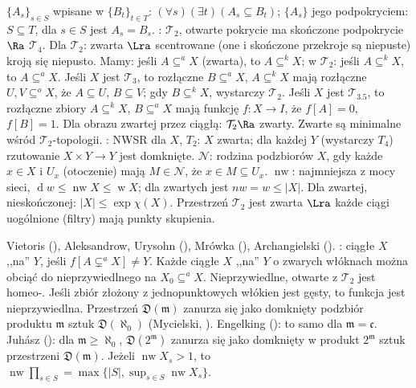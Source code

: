   $\{A_s\}_{s\in S}$ wpisane w $\{B_t\}_{t \in T}$: $(\forall s)(\exists t)(A_s \subseteq B_t)$; $\{A_s\}$ jego podpokryciem: $S \subseteq T$, dla $s \in S$ jest $A_s = B_s$.
: $\mathcal T_2$, otwarte pokrycie ma skończone podpokrycie $\Ra$ $\mathcal T_4$.
Dla $\mathcal T_2$: zwarta $\Lra$ scentrowane  (one i skończone przekroje są niepuste) kroją się niepusto.
Mamy: jeśli $A \subseteq^a X$ (zwarta), to $A \subseteq^k X$; w $\mathcal T_2$: jeśli $A \subseteq^k X$, to $A \subseteq^a X$.
Jeśli $X$ jest $\mathcal T_3$, to rozłączne $B \subseteq^a X$, $A \subseteq^k X$ mają rozłączne $U, V \subseteq^o X$, że $A \subseteq U$, $B \subseteq V$; gdy $B \subseteq^k X$, wystarczy $\mathcal T_2$.
Jeśli $X$ jest $\mathcal T_{3.5}$, to rozłączne zbiory $A \subseteq^k X$, $B \subseteq^a X$ mają funkcję $f \colon X \to I$, że $f[A] = 0$, $f[B] = 1$.
Dla obrazu zwartej przez ciągłą: $\mathcal T_2 \Ra$ zwarty.
Zwarte są minimalne wśród $\mathcal T_2$-topologii.
: NWSR dla $X$, $T_2$: $X$ zwarta; dla każdej $Y$ (wystarczy $T_4$) rzutowanie $X \times Y \to Y$ jest domknięte.
 $\mathcal N $: rodzina podzbiorów $X$, gdy każde $x \in X$ i $U_x$ (otoczenie) mają $M \in \mathcal N$, że $x \in M \subseteq U_x$.
 $\operatorname{nw}$: najmniejsza z mocy sieci, $\operatorname{d} w \le \operatorname{nw} X \le \operatorname{w} X$; dla zwartych jest $nw = w \le |X|$.
Dla zwartej, nieskończonej: $|X| \le \exp \chi(X)$.
Przestrzeń $\mathcal T_2$ jest zwarta $\Lra$ każde ciągi uogólnione (filtry) mają punkty skupienia.

Vietoris (), Aleksandrow, Urysohn (), Mrówka (), Archangielski ().
: ciągłe $X$ ,,na'' $Y$, jeśli $f[A \subsetneq^a X] \neq Y$.
Każde ciągłe $X$ ,,na'' $Y$ o zwarych włóknach można obciąć do nieprzywiedlnego na $X_0 \subseteq^a X$.
Nieprzywiedlne, otwarte z $\mathcal T_2$ jest homeo-.
Jeśli zbiór złożony z jednopunktowych włókien jest gęsty, to funkcja jest nieprzywiedlna.
Przestrzeń $\mathfrak D(\mathfrak m)$ zanurza się jako domknięty podzbiór produktu $\mathfrak m$ sztuk $\mathfrak D(\aleph_0)$ (Mycielski, ).
Engelking (): to samo dla $\mathfrak m = \mathfrak c$.
Juhász (): dla $\mathfrak m \ge \aleph_0$, $\mathfrak D(2^{\mathfrak m})$ zanurza się jako domknięty w produkt $2^{\mathfrak m}$ sztuk przestrzeni $\mathfrak D(\mathfrak m)$.
Jeżeli $\operatorname{nw} X_s > 1$, to $\operatorname{nw} \prod_{s \in S} = \max \{|S|, \sup_{s \in S} \operatorname{nw} X_s\}$.


